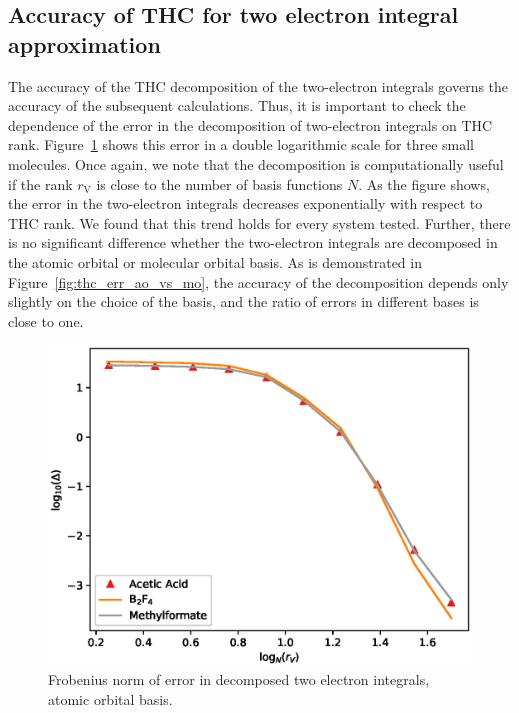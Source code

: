 \subsection{Accuracy of THC for two electron integral approximation}
The accuracy of the THC decomposition of the two-electron integrals governs the
accuracy of the subsequent calculations. Thus, it is important to 
check the dependence of the error in the decomposition of
two-electron integrals on THC rank. Figure~\ref{fig:thc_err_mo_3systems} 
shows this error in a double logarithmic scale for three small molecules. 
Once again, we note that the decomposition is computationally useful if the 
rank $r_\mathrm{V}$ is close to the number of basis functions $N$.  As the 
figure shows, the error in the two-electron integrals decreases exponentially 
with respect to THC rank. We found that this trend holds for every system
tested. Further, there is no significant difference whether the two-electron 
integrals are decomposed in the atomic orbital or molecular orbital basis. As 
is demonstrated in Figure~\ref{fig:thc_err_ao_vs_mo}, the accuracy of the 
decomposition depends only slightly on the choice of the basis, and the ratio 
of errors in different bases is close to one.
%
\begin{figure}[tb]
\includegraphics[width=\columnwidth]{figures/thc_rccsd/thc_err_mo_3systems}
\caption{Frobenius norm of error in decomposed two electron integrals, atomic 
orbital basis.
\label{fig:thc_err_mo_3systems}}
\end{figure}
%
